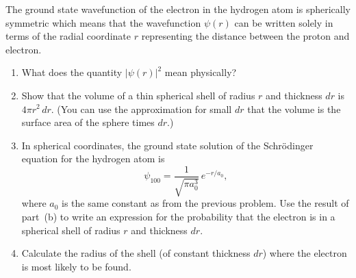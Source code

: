 
\begin{problem}
  The ground state wavefunction of the electron in the hydrogen atom
  is spherically symmetric which means that the wavefunction $\psi(r)$
  can be written solely in terms of the radial coordinate $r$
  representing the distance between the proton and electron.

\begin{enumerate}
\item What does the quantity $|\psi(r)|^2$ mean physically?

\item Show that the volume of a thin spherical shell of radius $r$
  and thickness $dr$ is $4\pi r^2\, dr$. (You can use the approximation
for small $dr$ that the volume is the surface area of the sphere
times $dr$.)

\item In spherical coordinates, the ground state solution of the
  Schr\"{o}dinger equation for the hydrogen atom is
\[ \psi_{100} = \frac{1}{\sqrt{\pi a_0^3}}\,  e^{-r/a_0}, \] 
where $a_0$ is the same constant as from the previous problem.  Use the
  result of part~(b) to write an expression for the probability that
  the electron is in a spherical shell of radius $r$ and thickness
  $dr$.

\item Calculate the radius of the shell (of constant thickness $dr$)
  where the electron is most likely to be found.
\end{enumerate}
\label{prob:hydrogen_wavefn}
\end{problem}


